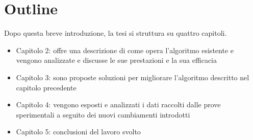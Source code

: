 \section{Outline}
	Dopo questa breve introduzione, la tesi si struttura su quattro capitoli.
	\begin{itemize}
		\item Capitolo 2: offre una descrizione di come opera l'algoritmo esistente e vengono analizzate e discusse le sue prestazioni e la sua efficacia
		\item Capitolo 3: sono proposte soluzioni per migliorare l'algoritmo descritto nel capitolo precedente
		\item Capitolo 4: vengono esposti e analizzati i dati raccolti dalle prove sperimentali a seguito dei nuovi cambiamenti introdotti
		\item Capitolo 5: conclusioni del lavoro svolto
	\end{itemize}
	
















